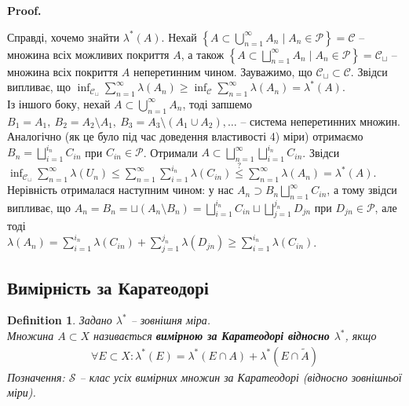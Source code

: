 \documentclass[a4paper, 10pt]{article}
\makeatletter
\theoremstyle{theoremdd}
\newtheorem{definition}[theorem]{Definition}
\renewenvironment{proof}[1][Proof.\\]{\par
\pushQED{\hfill \qed}%
\normalfont \topsep6\p@\@plus6\p@\relax
\trivlist
\item\relax
{\bfseries
#1\@addpunct{.}}\hspace\labelsep\ignorespaces
}{%
\popQED\endtrivlist\@endpefalse
}
\makeatother
\begin{document}
\begin{proof}
Справді, хочемо знайти $\lambda^*(A)$. Нехай $\left\{ A \subset \displaystyle\bigcup_{n=1}^\infty A_n \mid A_n \in \mathcal{P}\right\} = \mathcal{C}$ -- множина всіх можливих покриття $A$, а також $\left\{ A \subset \displaystyle\bigsqcup_{n=1}^\infty A_n \mid A_n \in \mathcal{P}\right\} = \mathcal{C}_\sqcup$ -- множина всіх покриття $A$ неперетинним чином. Зауважимо, що $\mathcal{C}_{\sqcup} \subset \mathcal{C}$. Звідси випливає, що $\displaystyle\inf_{\mathcal{C}_{\sqcup}} \sum_{n=1}^\infty \lambda(A_n) \geq \displaystyle\inf_{\mathcal{C}} \sum_{n=1}^\infty \lambda(A_n) =\lambda^*(A)$.\\
Із іншого боку, нехай $A \subset \displaystyle\bigcup_{n=1}^\infty A_n$, тоді запшемо $B_1 = A_1,\ B_2 = A_2 \setminus A_1,\ B_3 = A_3 \setminus (A_1 \cup A_2), \dots$ -- система неперетинних множин. Аналогічно (як це було під час доведення властивості 4) міри) отримаємо $B_n = \displaystyle\bigsqcup_{i=1}^{i_n} C_{in}$ при $C_{in} \in \mathcal{P}$. Отримали $\displaystyle A \subset \bigsqcup_{n=1}^{\infty} \bigsqcup_{i=1}^{i_n} C_{in}$. Звідси\\
$\displaystyle\inf_{\mathcal{C}_{\sqcup}} \sum_{n=1}^\infty \lambda(U_n) \leq \sum_{n=1}^\infty \sum_{i=1}^{i_n} \lambda(C_{in}) \overset{?}{\leq} \sum_{n=1}^\infty \lambda(A_n) = \lambda^*(A)$.\\
Нерівність отрималася наступним чином: у нас $A_n \supset B_n \displaystyle\bigsqcup_{n=1}^\infty C_{in}$, а тому звідси випливає, що $\displaystyle A_n = B_n = \sqcup (A_n \setminus B_n) = \bigsqcup_{i=1}^{i_n} C_{in} \sqcup \bigsqcup_{j=1}^{j_n} D_{jn}$ при $D_{jn} \in \mathcal{P}$, але тоді\\
$\lambda(A_n) = \displaystyle\sum_{i=1}^{i_n} \lambda(C_{in}) + \sum_{j=1}^{j_n} \lambda(D_{jn}) \geq \sum_{i=1}^{i_n} \lambda(C_{in})$.
\end{proof}

\subsection{Вимірність за Каратеодорі}
\begin{definition}
Задано $\lambda^*$ -- зовнішня міра.\\
Множина $A \subset X$ називається \textbf{вимірною за Каратеодорі відносно $\lambda^*$}, якщо
\begin{align*}
\forall E \subset X: \lambda^*(E) = \lambda^*(E \cap A) + \lambda^*(E \cap \tilde{A})
\end{align*}
Позначення: $\mathcal{S}$ -- клас усіх вимірних множин за Каратеодорі (відносно зовнішньої міри).
\end{definition}
\end{document}
